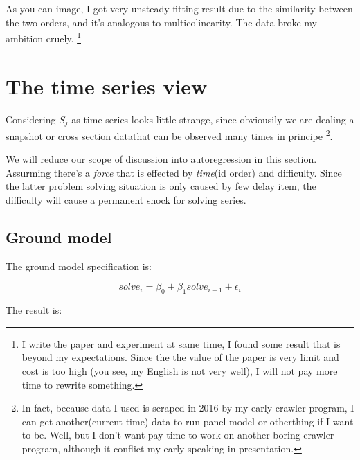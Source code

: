 \documentclass{article}
\begin{document}
As you can image, I got very unsteady fitting result due to the similarity between the two orders, and it's analogous
to multicolinearity. The data broke my ambition cruely. \footnote{I write the paper and experiment at same time,
I found some result that is beyond my expectations. Since the the value of the paper is very limit and cost is too high
(you see, my English is not very well), I will not pay more time to rewrite something.}

\section{The time series view}

Considering $S_j$ as time series looks little strange, since obviousily we are dealing a snapshot or cross section 
datathat can be observed many times in principe \footnote{In fact, because data I used is scraped in 2016 
by my early crawler program, I can get another(current time) data to run panel model or otherthing 
if I want to be. Well, but I don't want pay time to work on another boring crawler program, 
although it conflict my early speaking in presentation.}.

We will reduce our scope of discussion into autoregression in this section. Assurming there's a \textit{force}
that is effected by \textit{time}(id order) and difficulty. Since the latter problem solving situation
is only caused by few delay item, the difficulty will cause a permanent shock for solving series.

\subsection{Ground model}

The ground model specification is:

\[
solve_i = \beta_0 + \beta_1 solve_{i-1} + \epsilon_i
\]

The result is:
\end{document}
